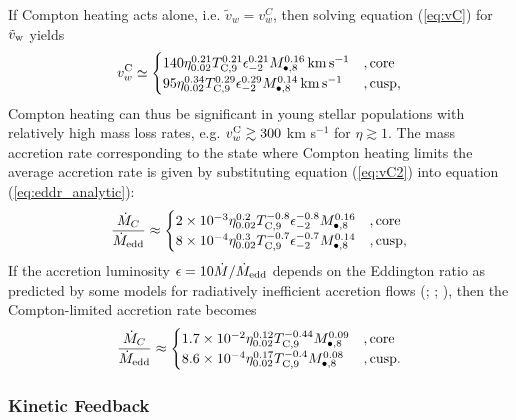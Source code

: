 \documentclass[usenatbib,fleqn]{mn2e}
\begin{document}
If Compton heating acts alone, i.e. $\tilde{v}_{w} = v_{w}^{C}$, then
solving equation (\ref{eq:vC}) for $\tilde{v}_{\rm w}$ yields
\begin{align} v_{w}^{\rm C} \simeq
  \begin{cases} 140 \eta_{0.02}^{0.21}T_{\rm
C,9}^{0.21}\epsilon_{-2}^{0.21} M_{\bullet,8}^{0.16}\,{\rm km\,s^{-1}}
&, \text{core}\\ 95 \eta_{0.02}^{0.34}T_{\rm
C,9}^{0.29}\epsilon_{-2}^{0.29} M_{\bullet,8}^{0.14}\,{\rm km\,s^{-1}}
&, \text{cusp},
  \end{cases}
  \label{eq:vC2}
\end{align} 
Compton heating can thus be significant in young stellar populations
with relatively high mass loss rates, e.g. $v_{w}^{\rm C} \gtrsim 300$
km s$^{-1}$ for $\eta \gtrsim 1$.  The mass accretion rate
corresponding to the state where Compton heating limits the average
accretion rate is given by substituting equation (\ref{eq:vC2}) into
equation (\ref{eq:eddr_analytic}):
\begin{align}
\frac{\dot{M}_{C}}{\dot{M}_{\rm edd}} \approx 
\begin{cases} 2\times 10^{-3} \eta_{0.02}^{0.2}T_{\rm
C,9}^{-0.8}\epsilon_{-2}^{-0.8} M_{\bullet,8}^{0.16}
&, \text{core}\\ 8\times 10^{-4} \eta_{0.02}^{0.3}T_{\rm
C,9}^{-0.7}\epsilon_{-2}^{-0.7} M_{\bullet,8}^{0.14}
&, \text{cusp},
  \end{cases}
  \label{eq:MdotCa}
\end{align}
If the accretion luminosity $\epsilon = 10 \dot{M}/\dot{M}_{\rm edd}$
depends on the Eddington ratio as predicted by some models for
radiatively inefficient accretion flows (\citealt{Narayan&Yi95};
\citealt{Narayan+98}; \citealt{XieYuan:2012a}), then the Compton-limited accretion rate becomes
\begin{align}
\frac{\dot{M}_{C}}{\dot{M}_{\rm edd}} \approx 
\begin{cases} 1.7\times 10^{-2} \eta_{0.02}^{0.12}T_{\rm
C,9}^{-0.44}M_{\bullet,8}^{0.09}
&, \text{core}\\ 8.6\times 10^{-4} \eta_{0.02}^{0.17}T_{\rm
C,9}^{-0.4} M_{\bullet,8}^{0.08}
&, \text{cusp}.
  \end{cases}
  \label{eq:MdotC}
\end{align}


\subsubsection{Kinetic Feedback}
\end{document}
